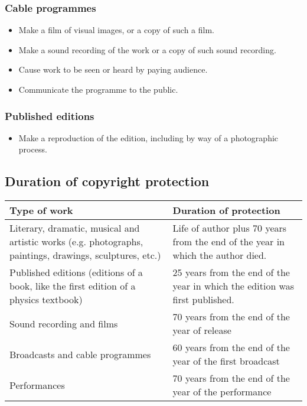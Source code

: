 \documentclass[11pt]{article}
\begin{document}
\subsubsection{Cable programmes}
\label{sec:orgacc5b71}
\begin{itemize}
\item Make a film of visual images, or a copy of such a film.
\item Make a sound recording of the work or a copy of such sound recording.
\item Cause work to be seen or heard by paying audience.
\item Communicate the programme to the public.
\end{itemize}

\subsubsection{Published editions}
\label{sec:orgc6b108b}
\begin{itemize}
\item Make a reproduction of the edition, including by way of a photographic process.
\end{itemize}

 \newpage

\subsection{Duration of copyright protection}
\label{sec:org5df7df2}
\begin{center}
\begin{tabular}{m{16em}|m{16em}}
Type of work & Duration of protection\\[0pt]
\hline
Literary, dramatic, musical and artistic works (e.g. photographs, paintings, drawings, sculptures, etc.) & Life of author plus 70 years from the end of the year in which the author died.\\[0pt]
\hline
Published editions (editions of a book, like the first edition of a physics textbook) & 25 years from the end of the year in which the edition was first published.\\[0pt]
\hline
Sound recording and films & 70 years from the end of the year of release\\[0pt]
\hline
Broadcasts and cable programmes & 60 years from the end of the year of the first broadcast\\[0pt]
\hline
Performances & 70 years from the end of the year of the performance\\[0pt]
\end{tabular}
\end{center}
\end{document}

